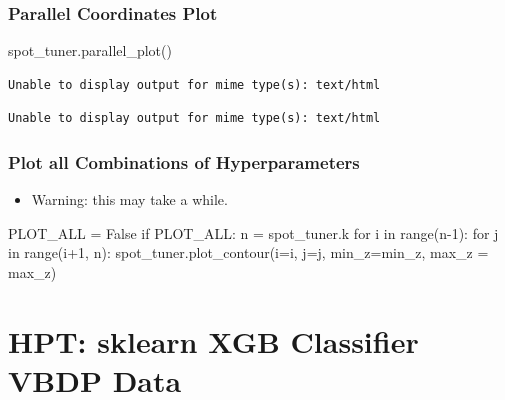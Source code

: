 \documentclass[
  letterpaper,
  DIV=11,
  numbers=noendperiod]{scrreprt}
\newenvironment{Shaded}{\begin{snugshade}}{\end{snugshade}}
\newcommand{\BuiltInTok}[1]{\textcolor[rgb]{0.00,0.23,0.31}{#1}}
\newcommand{\ControlFlowTok}[1]{\textcolor[rgb]{0.00,0.23,0.31}{#1}}
\newcommand{\DecValTok}[1]{\textcolor[rgb]{0.68,0.00,0.00}{#1}}
\newcommand{\KeywordTok}[1]{\textcolor[rgb]{0.00,0.23,0.31}{#1}}
\newcommand{\NormalTok}[1]{\textcolor[rgb]{0.00,0.23,0.31}{#1}}
\newcommand{\OperatorTok}[1]{\textcolor[rgb]{0.37,0.37,0.37}{#1}}
\newcommand{\VariableTok}[1]{\textcolor[rgb]{0.07,0.07,0.07}{#1}}
\providecommand{\tightlist}{%
  \setlength{\itemsep}{0pt}\setlength{\parskip}{0pt}}\usepackage{longtable,booktabs,array}
\begin{document}
\hypertarget{parallel-coordinates-plot-1}{%
\subsection{Parallel Coordinates
Plot}\label{parallel-coordinates-plot-1}}

\begin{Shaded}
\begin{Highlighting}[]
\NormalTok{spot\_tuner.parallel\_plot()}
\end{Highlighting}
\end{Shaded}

\begin{verbatim}
Unable to display output for mime type(s): text/html
\end{verbatim}

\begin{verbatim}
Unable to display output for mime type(s): text/html
\end{verbatim}

\hypertarget{plot-all-combinations-of-hyperparameters-2}{%
\subsection{Plot all Combinations of
Hyperparameters}\label{plot-all-combinations-of-hyperparameters-2}}

\begin{itemize}
\tightlist
\item
  Warning: this may take a while.
\end{itemize}

\begin{Shaded}
\begin{Highlighting}[]
\NormalTok{PLOT\_ALL }\OperatorTok{=} \VariableTok{False}
\ControlFlowTok{if}\NormalTok{ PLOT\_ALL:}
\NormalTok{    n }\OperatorTok{=}\NormalTok{ spot\_tuner.k}
    \ControlFlowTok{for}\NormalTok{ i }\KeywordTok{in} \BuiltInTok{range}\NormalTok{(n}\OperatorTok{{-}}\DecValTok{1}\NormalTok{):}
        \ControlFlowTok{for}\NormalTok{ j }\KeywordTok{in} \BuiltInTok{range}\NormalTok{(i}\OperatorTok{+}\DecValTok{1}\NormalTok{, n):}
\NormalTok{            spot\_tuner.plot\_contour(i}\OperatorTok{=}\NormalTok{i, j}\OperatorTok{=}\NormalTok{j, min\_z}\OperatorTok{=}\NormalTok{min\_z, max\_z }\OperatorTok{=}\NormalTok{ max\_z)}
\end{Highlighting}
\end{Shaded}

\hypertarget{sec-hpt-sklearn-xgb-classifier-vbdp-data}{%
\chapter{HPT: sklearn XGB Classifier VBDP
Data}\label{sec-hpt-sklearn-xgb-classifier-vbdp-data}}
\end{document}
